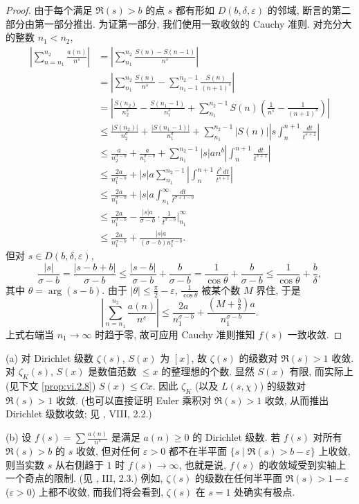 \begin{proof}
由于每个满足 $\Re(s)>b$ 的点 $s$ 都有形如 $D(b,\delta,\varepsilon)$ 的邻域, 断言的第二部分由第一部分推出. 为证第一部分, 我们使用一致收敛的 Cauchy 准则. 对充分大的整数 $n_1<n_2$,
\begin{align*}
\left|\sum_{n=n_{1}}^{n_{2}}\frac{a(n)}{n^{s}}\right|
&=\left|\sum_{n_{1}}^{n_{2}}\frac{S(n)-S(n-1)}{n^{s}}\right|\\
&=\left|\sum_{n_{1}}^{n_{2}}\frac{S(n)}{n^{s}}-\sum_{n_{1}-1}^{n_{2}-1}\frac{S(n)}{(n+1)^{s}}\right|\\
&=\left|\frac{S(n_{2})}{n_{2}^{s}}-\frac{S(n_{1}-1)}{n_{1}^{s}}+\sum_{n_{1}}^{n_{2}-1}S(n)\left(\frac{1}{n^{s}}-\frac{1}{(n+1)^{s}}\right)\right|\\
&\le\frac{|S(n_{2})|}{n_{2}^{\sigma}}+\frac{|S(n_{1}-1)|}{n_{1}^{\sigma}}+\sum_{n_{1}}^{n_{2}-1}|S(n)|\left|s\int_{n}^{n+1}\frac{dt}{t^{s+1}}\right|\\
&\le\frac{a}{n_{2}^{\sigma-b}}+\frac{a}{n_{1}^{\sigma-b}}+\sum_{n_{1}}^{n_{2}-1}|s|an^{b}\left|\int_{n}^{n+1}\frac{dt}{t^{s+1}}\right|\\
&\le\frac{2a}{n_{1}^{\sigma-b}}+|s|a\sum_{n_{1}}^{n_{2}-1}\left|\int_{n}^{n+1}\frac{t^{b}\,dt}{t^{s+1}}\right|\\
&\le\frac{2a}{n_{1}^{\sigma-b}}+|s|a\int_{n_{1}}^{\infty}\frac{dt}{t^{\sigma+1-b}}\\
&\le\frac{2a}{n_{1}^{\sigma-b}}-\frac{|s|a}{\sigma-b}\cdot\frac{1}{t^{\sigma-b}}\bigg|_{n_{1}}^{\infty}\\
&\le\frac{2a}{n_{1}^{\sigma-b}}+\frac{|s|a}{(\sigma-b)n_{1}^{\sigma-b}}.
\end{align*}
但对 $s\in D(b,\delta,\varepsilon)$,
\[
\frac{|s|}{\sigma-b}=\frac{|s-b+b|}{\sigma-b}\le\frac{|s-b|}{\sigma-b}+\frac{b}{\sigma-b}=\frac{1}{\cos\theta}+\frac{b}{\sigma-b}\le\frac{1}{\cos\theta}+\frac{b}{\delta},
\]
其中 $\theta=\arg(s-b)$. 由于 $|\theta|\le\frac{\pi}{2}-\varepsilon$, $\frac{1}{\cos\theta}$ 被某个数 $M$ 界住, 于是
\[
\left|\sum_{n=n_{1}}^{n_{2}}\frac{a(n)}{n^{s}}\right|\le\frac{2a}{n_{1}^{\sigma-b}}+\frac{(M+\frac{b}{\delta})a}{n_{1}^{\sigma-b}}.
\]
上式右端当 $n_1\to\infty$ 时趋于零, 故可应用 Cauchy 准则推知 $f(s)$ 一致收敛.
\end{proof}

\begin{remark}\label{rem:vi.2.2}
(a) 对 Dirichlet 级数 $\zeta(s)$, $S(x)$ 为 $[x]$, 故 $\zeta(s)$ 的级数对 $\Re(s)>1$ 收敛. 对 $\zeta_K(s)$, $S(x)$ 是数值范数 $\le x$ 的整理想的个数. 显然 $S(x)$ 有限, 而实际上 (见下文 \ref{prop:vi.2.8}) $S(x)\le Cx$. 因此 $\zeta_K$ (以及 $L(s,\chi)$) 的级数对 $\Re(s)>1$ 收敛. (也可以直接证明 Euler 乘积对 $\Re(s)>1$ 收敛, 从而推出 Dirichlet 级数收敛; 见 \cite{FrohlichTaylor1991}, VIII, 2.2.)

(b) 设 $f(s)=\sum\frac{a(n)}{n^{s}}$ 是满足 $a(n)\ge0$ 的 Dirichlet 级数. 若 $f(s)$ 对所有 $\Re(s)>b$ 的 $s$ 收敛, 但对任何 $\varepsilon>0$ 都不在半平面 $\{s\mid\Re(s)>b-\varepsilon\}$ 上收敛, 则当实数 $s$ 从右侧趋于 $1$ 时 $f(s)\to\infty$, 也就是说, $f(s)$ 的收敛域受到实轴上一个奇点的限制. (见 \cite{Serre1970}, III, 2.3.) 例如, $\zeta(s)$ 的级数在任何半平面 $\Re(s)>1-\varepsilon$ ($\varepsilon>0$) 上都不收敛, 而我们将会看到, $\zeta(s)$ 在 $s=1$ 处确实有极点.
\end{remark}


